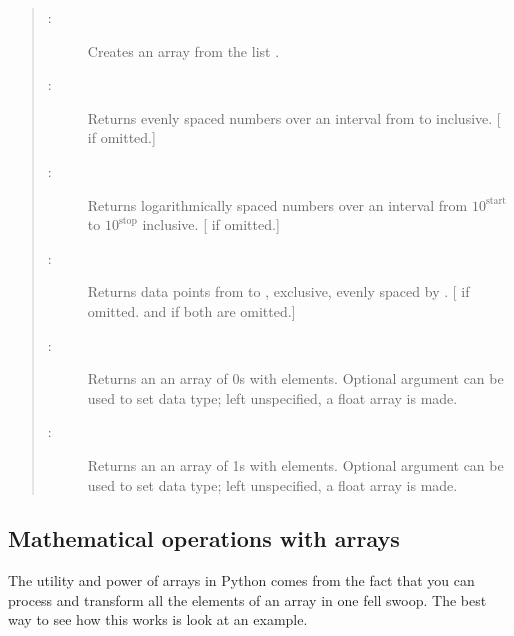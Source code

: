 \documentclass[letterpaper,10pt,english]{sphinxmanual}
\begin{document}
\begin{quote}
\begin{description}
\item[{:}] \leavevmode
Creates an array from the list .

\item[{:}] \leavevmode
Returns  evenly spaced numbers over an interval from  to  inclusive.  {[} if omitted.{]}

\item[{:}] \leavevmode
Returns  logarithmically spaced numbers over an interval from \(10^{\mathrm{start}}\) to \(10^{\mathrm{stop}}\) inclusive.  {[} if omitted.{]}

\item[{:}] \leavevmode
Returns data points from  to , exclusive, evenly spaced by .  {[} if omitted.   and  if both are omitted.{]}

\item[{:}] \leavevmode
Returns an an array of 0s with  elements.  Optional  argument can be used to set data type; left unspecified, a float array is made.

\item[{:}] \leavevmode
Returns an an array of 1s with  elements.  Optional  argument can be used to set data type; left unspecified, a float array is made.

\end{description}
\end{quote}


\subsection{Mathematical operations with arrays}
\label{chap3/chap3_arrays:mathematical-operations-with-arrays}
The utility and power of arrays in Python comes from the fact that you can process and transform all the elements of an array in one fell swoop.  The best way to see how this works is look at an example.
\end{document}
